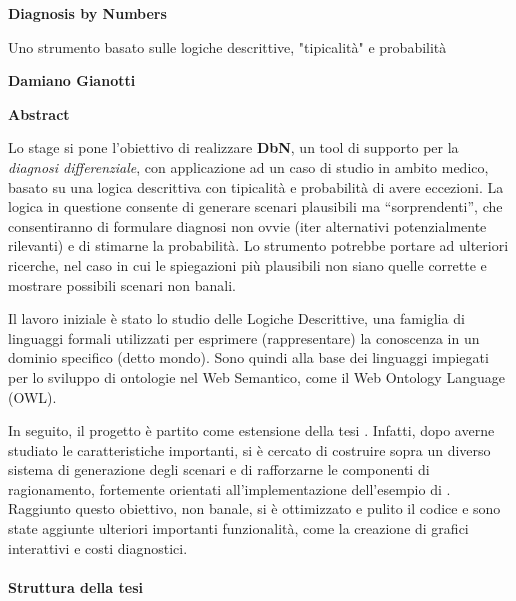 

\thispagestyle{plain}
\begin{center}
	\Large
	\textbf{Diagnosis by Numbers}
	
	\vspace{0.4cm}
	\large
	Uno strumento basato sulle logiche descrittive, "tipicalità" e probabilità
	
	\vspace{0.4cm}
	\textbf{Damiano Gianotti}
	
	\vspace{0.9cm}
	\textbf{Abstract}
\end{center}

Lo stage si pone l’obiettivo di realizzare \textbf{DbN}, un tool di supporto per la \textit{diagnosi differenziale}, 
con applicazione ad un caso di studio in ambito medico, basato su una logica descrittiva con tipicalità e probabilità di avere eccezioni.
La logica in questione consente di generare scenari plausibili ma “sorprendenti”, che consentiranno di formulare
diagnosi non ovvie  (iter alternativi potenzialmente rilevanti) e di stimarne la probabilità. 
Lo strumento potrebbe portare ad ulteriori ricerche, nel caso in cui le spiegazioni
più plausibili non siano quelle corrette e mostrare possibili scenari non banali.
 
Il lavoro iniziale è stato lo studio delle Logiche Descrittive, una famiglia 
di linguaggi formali utilizzati per esprimere (rappresentare) la conoscenza 
in un dominio specifico (detto mondo). Sono quindi alla base dei linguaggi impiegati per lo sviluppo
di ontologie nel Web Semantico, come il Web Ontology Language (OWL).

In seguito, il progetto è partito come estensione della tesi  \cite{PEAR}. Infatti, dopo averne studiato le caratteristiche importanti, si è cercato di costruire sopra
un diverso sistema di generazione degli scenari e di rafforzarne le componenti di ragionamento, fortemente orientati all'implementazione dell'esempio di  \cite{ProbOfEx}.
Raggiunto questo obiettivo, non banale, si è ottimizzato e pulito il codice
e sono state aggiunte ulteriori importanti funzionalità, come la creazione di grafici interattivi e costi
diagnostici.

\paragraph{Struttura della tesi} \hfill

